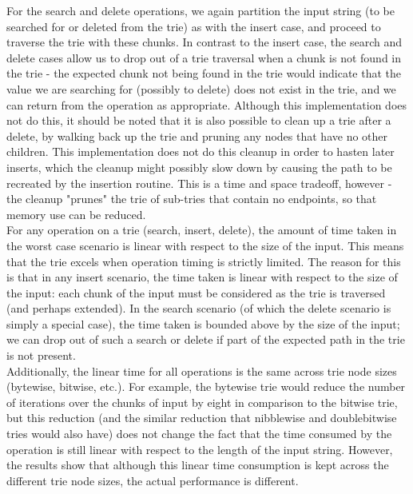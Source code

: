 \documentclass{llncs}
\begin{document}
For the search and delete operations, we again partition the input string (to be searched for or deleted from the trie) as with the insert case, and proceed to traverse the trie with these chunks. In contrast to the insert case, the search and delete cases allow us to drop out of a trie traversal when a chunk is not found in the trie - the expected chunk not being found in the trie would indicate that the value we are searching for (possibly to delete) does not exist in the trie, and we can return from the operation as appropriate. Although this implementation does not do this, it should be noted that it is also possible to clean up a trie after a delete, by walking back up the trie and pruning any nodes that have no other children. This implementation does not do this cleanup in order to hasten later inserts, which the cleanup might possibly slow down by causing the path to be recreated by the insertion routine. This is a time and space tradeoff, however - the cleanup "prunes" the trie of sub-tries that contain no endpoints, so that memory use can be reduced.\\
For any operation on a trie (search, insert, delete), the amount of time taken in the worst case scenario is linear with respect to the size of the input. This means that the trie excels when operation timing is strictly limited. The reason for this is that in any insert scenario, the time taken is linear with respect to the size of the input: each chunk of the input must be considered as the trie is traversed (and perhaps extended). In the search scenario (of which the delete scenario is simply a special case), the time taken is bounded above by the size of the input; we can drop out of such a search or delete if part of the expected path in the trie is not present. \\
Additionally, the linear time for all operations is the same across trie node sizes (bytewise, bitwise, etc.). For example, the bytewise trie would reduce the number of iterations over the chunks of input by eight in comparison to the bitwise trie, but this reduction (and the similar reduction that nibblewise and doublebitwise tries would also have) does not change the fact that the time consumed by the operation is still linear with respect to the length of the input string. However, the results show that although this linear time consumption is kept across the different trie node sizes, the actual performance is different.\\
\newpage
\end{document}
